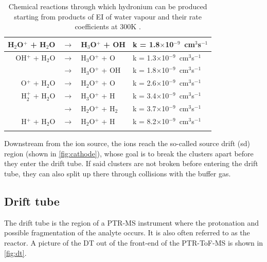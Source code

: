 




\begin{table}[t]
\centering
\caption{Chemical reactions through which hydronium can be produced starting from products of EI of water vapour and their rate coefficients at 300K \cite{doi:10.1002/rcm.1290030312}.}
\label{tb:reactions}
\begin{tabular}{ rcl l }
\toprule
\quad H$_2$O$^+$ + H$_2$O 	&$\rightarrow$& H$_3$O$^+$ + OH  	& k = 1.8$\times$10$^{-9}$\, cm$^{3}$s$^{-1}$ \qquad \\ \midrule
OH$^+$ + H$_2$O  	&$\rightarrow$& H$_3$O$^+$ + O  		& k = 1.3$\times$10$^{-9}$\, cm$^{3}$s$^{-1}$  \\
				& $\rightarrow$& H$_3$O$^+$ + OH		& k = 1.8$\times$10$^{-9}$\, cm$^{3}$s$^{-1}$	  \\ \midrule
O$^+$ + H$_2$O  	&$\rightarrow$& H$_2$O$^+$ + O  		& k = 2.6$\times$10$^{-9}$\, cm$^{3}$s$^{-1}$   \\ \midrule
H$_2^+$ + H$_2$O  	&$\rightarrow$& H$_3$O$^+$ + H  		& k = 3.4$\times$10$^{-9}$\, cm$^{3}$s$^{-1}$   \\
				& $\rightarrow$& H$_2$O$^+$ + H$_2$ 		& k = 3.7$\times$10$^{-9}$\, cm$^{3}$s$^{-1}$	  \\ \midrule
H$^+$ + H$_2$O  	&$\rightarrow$& H$_2$O$^+$ + H  		& k = 8.2$\times$10$^{-9}$\, cm$^{3}$s$^{-1}$   \\ \bottomrule
\\
\end{tabular}
\end{table}



Downstream from the ion source, the ions reach the so-called source drift (\acrshort{sd}) region (shown in  \autoref{fig:cathode}), whose goal is to break the clusters apart before they enter the drift tube. If said clusters are not broken before entering the drift tube, they can also  split up there through collisions with the buffer gas.










\subsection{Drift tube}
The drift tube %
is the region of a PTR-MS instrument where the protonation and possible fragmentation of the analyte occurs. It is also often referred to as the reactor. A picture of the DT out of the front-end of the PTR-ToF-MS is shown in \autoref{fig:dt}.

